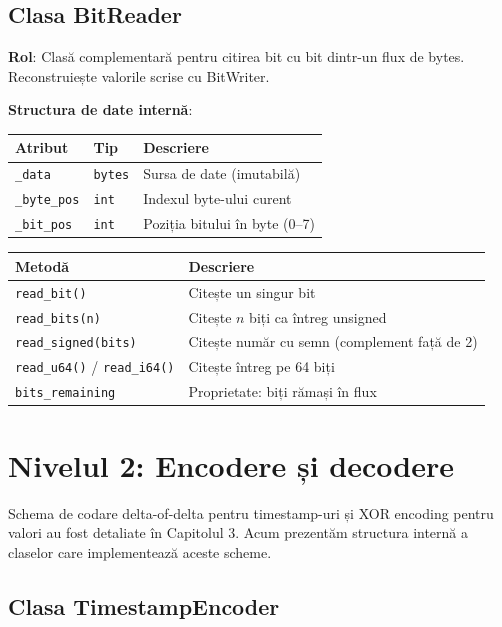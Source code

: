 \subsection{Clasa BitReader}

\textbf{Rol}: Clasă complementară pentru citirea bit cu bit dintr-un flux de bytes. Reconstruiește valorile scrise cu BitWriter.

\textbf{Structura de date internă}:
\begin{center}
\begin{tabular}{|l|l|p{7cm}|}
\hline
\textbf{Atribut} & \textbf{Tip} & \textbf{Descriere} \\
\hline
\texttt{\_data} & \texttt{bytes} & Sursa de date (imutabilă) \\
\texttt{\_byte\_pos} & \texttt{int} & Indexul byte-ului curent \\
\texttt{\_bit\_pos} & \texttt{int} & Poziția bitului în byte (0--7) \\
\hline
\end{tabular}
\end{center}

\begin{center}
\begin{tabular}{|l|p{8cm}|}
\hline
\textbf{Metodă} & \textbf{Descriere} \\
\hline
\texttt{read\_bit()} & Citește un singur bit \\
\texttt{read\_bits(n)} & Citește $n$ biți ca întreg unsigned \\
\texttt{read\_signed(bits)} & Citește număr cu semn (complement față de 2) \\
\texttt{read\_u64()} / \texttt{read\_i64()} & Citește întreg pe 64 biți \\
\texttt{bits\_remaining} & Proprietate: biți rămași în flux \\
\hline
\end{tabular}
\end{center}

\section{Nivelul 2: Encodere și decodere}

Schema de codare delta-of-delta pentru timestamp-uri și XOR encoding pentru valori au fost detaliate în Capitolul 3. Acum prezentăm structura internă a claselor care implementează aceste scheme.

\subsection{Clasa TimestampEncoder}

